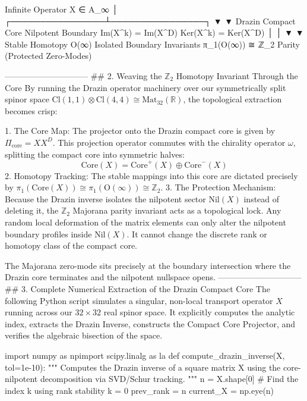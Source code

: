                   Infinite Operator X ∈ A_∞
                             │
            ┌────────────────┴────────────────┐
            ▼                                 ▼
   Drazin Compact Core               Nilpotent Boundary
     Im(X^k) = Im(X^D)                 Ker(X^k) = Ker(X^D)
            │                                 │
            ▼                                 ▼
  Stable Homotopy O(∞)              Isolated Boundary Invariants
  π_1(O(∞)) ≅ ℤ_2 Parity             (Protected Zero-Modes)

------------------------------
## 2. Weaving the $\mathbb{Z}_2$ Homotopy Invariant Through the Core
By running the Drazin operator machinery over our symmetrically split spinor space $\text{Cl}(1,1) \otimes \text{Cl}(4,4) \cong \text{Mat}_{32}(\mathbb{R})$, the topological extraction becomes crisp:

   1. The Core Map: The projector onto the Drazin compact core is given by $\Pi_{\text{core}} = X X^D$. This projection operator commutes with the chirality operator $\omega$, splitting the compact core into symmetric halves:
   $$\text{Core}(X) = \text{Core}^+(X) \oplus \text{Core}^-(X)$$ 
   2. Homotopy Tracking: The stable mappings into this core are dictated precisely by $\pi_1(\text{Core}(X)) \cong \pi_1(\text{O}(\infty)) \cong \mathbb{Z}_2$.
   3. The Protection Mechanism: Because the Drazin inverse isolates the nilpotent sector $\text{Nil}(X)$ instead of deleting it, the $\mathbb{Z}_2$ Majorana parity invariant acts as a topological lock. Any random local deformation of the matrix elements can only alter the nilpotent boundary profiles inside $\text{Nil}(X)$. It cannot change the discrete rank or homotopy class of the compact core.

The Majorana zero-mode sits precisely at the boundary intersection where the Drazin core terminates and the nilpotent nullspace opens.
------------------------------
## 3. Complete Numerical Extraction of the Drazin Compact Core
The following Python script simulates a singular, non-local transport operator $X$ running across our $32 \times 32$ real spinor space. It explicitly computes the analytic index, extracts the Drazin Inverse, constructs the Compact Core Projector, and verifies the algebraic bisection of the space.

import numpy as npimport scipy.linalg as la
def compute_drazin_inverse(X, tol=1e-10):
    """
    Computes the Drazin inverse of a square matrix X using 
    the core-nilpotent decomposition via SVD/Schur tracking.
    """
    n = X.shape[0]
    # Find the index k using rank stability
    k = 0
    prev_rank = n
    current_X = np.eye(n)
    

